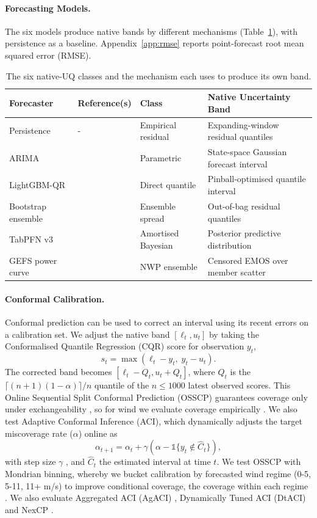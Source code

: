 \documentclass{article}
\begin{document}
\paragraph{Forecasting Models.} The six models produce native bands by different mechanisms (Table~\ref{tab:subjects}), with persistence as a baseline. Appendix~\ref{app:rmse} reports point-forecast root mean squared error (RMSE).

\begin{table}[htbp]
\caption{The six native-UQ classes and the mechanism each uses to produce its own band.}
\label{tab:subjects}
\centering
\small
\setlength{\tabcolsep}{5.5pt}
\begin{tabular}{@{}llll@{}}
\toprule
Forecaster & Reference(s) & Class & Native Uncertainty Band \\
\midrule
Persistence & - & Empirical residual & Expanding-window residual quantiles \\
ARIMA & \citet{box2015time} & Parametric & State-space Gaussian forecast interval \\
LightGBM-QR & \citet{ke2017lightgbm} & Direct quantile & Pinball-optimised quantile interval \\
Bootstrap ensemble & \citet{breiman1996bagging} & Ensemble spread & Out-of-bag residual quantiles \\
TabPFN v3 & \citet{grinsztajn2026tabpfn} & Amortised Bayesian & Posterior predictive distribution \\
GEFS power curve & \citet{gneiting2005calibrated} & NWP ensemble & Censored EMOS over member scatter \\
\bottomrule
\end{tabular}
\end{table}


\paragraph{Conformal Calibration.} Conformal prediction can be used to correct an interval using its recent errors on a calibration set. We adjust the native band $[\ell_t, u_t]$ by taking the Conformalised Quantile Regression (CQR) score \citep{romano2019conformalized} for observation $y_t$,
\[ s_t = \max(\ell_t - y_t,\; y_t - u_t). \]
The corrected band becomes $[\ell_t - Q_t, u_t + Q_t]$, where $Q_t$ is the $\lceil (n+1)(1-\alpha)\rceil/n$ quantile of the $n \le 1000$ latest observed scores. This Online Sequential Split Conformal Prediction (OSSCP) guarantees coverage only under exchangeability \citep{lei2018distribution}, so for wind we evaluate coverage empirically \citep{oliveira2024split}. We also test Adaptive Conformal Inference (ACI), which dynamically adjusts the target miscoverage rate ($\alpha$) online as
\[ \alpha_{t+1} = \alpha_t +\gamma(\alpha - \mathbb{1}\{y_t \notin \hat C_t\}), \] 
with step size $\gamma$ \citep{gibbs2021adaptive}, and $\hat{C}_t$ the estimated interval at time $t$. We test OSSCP with Mondrian binning, whereby we bucket calibration by forecasted wind regime (0-5, 5-11, 11+ m/s) to improve conditional coverage, the coverage within each regime \citep{vovk2005algorithmic}. We also evaluate Aggregated ACI (AgACI) \citep{zaffran2022adaptive}, Dynamically Tuned ACI (DtACI) \citep{gibbs2024conformal} and NexCP \citep{barber2023conformal}.
\end{document}
